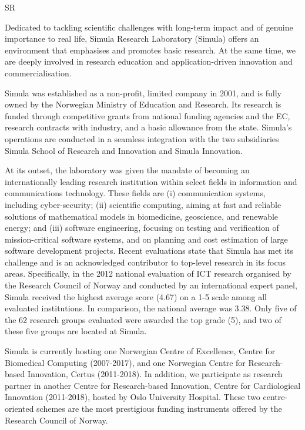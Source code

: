 \begin{sitedescription}{SR}

Dedicated to tackling scientific challenges with long-term impact and of genuine importance to real life, Simula Research Laboratory (Simula) offers an environment that emphasises and promotes basic research. At the same time, we are deeply involved in research education and application-driven innovation and commercialisation. 

Simula was established as a non-profit, limited company in 2001, and is fully owned by the Norwegian Ministry of Education and Research. Its research is funded through competitive grants from national funding agencies and the EC, research contracts with industry, and a basic allowance from the state.  Simula's operations are conducted in a seamless integration with the two subsidiaries Simula School of Research and Innovation and Simula Innovation.

At its outset, the laboratory was given the mandate of becoming an internationally leading research institution within select fields in information and communications technology. These fields are (i) communication systems, including cyber-security; (ii) scientific computing, aiming at fast and reliable solutions of mathematical models in biomedicine, geoscience, and renewable energy; and (iii) software engineering, focusing on testing and verification of mission-critical software systems, and on planning and cost estimation of large software development projects. Recent evaluations state that Simula has met its challenge and is an acknowledged contributor to top-level research in its focus areas. Specifically, in the 2012 national evaluation of ICT research organised by the Research Council of Norway and conducted by an international expert panel, Simula received the highest average score (4.67) on a 1-5 scale among all evaluated institutions.  In comparison, the national average was 3.38. Only five of the 62 research groups evaluated were awarded the top grade (5), and two of these five groups are located at Simula.

Simula is currently hosting one Norwegian Centre of Excellence, Centre for Biomedical Computing (2007-2017), and one Norwegian Centre for Research-based Innovation, Certus (2011-2018). In addition, we participate as research partner in another Centre for Research-based Innovation, Centre for Cardiological Innovation (2011-2018), hosted by Oslo University Hospital. These two centre-oriented schemes are the most prestigious funding instruments offered by the Research Council of Norway. 


\end{sitedescription}
